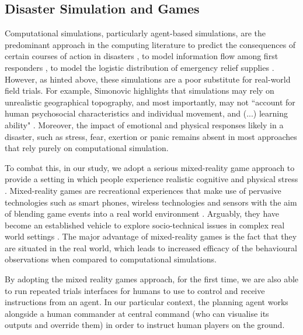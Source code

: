 \subsection{Disaster Simulation and Games}
Computational simulations, particularly agent-based simulations, are the predominant approach in the computing literature to predict the consequences of certain courses of action in disasters \cite{Hawe2012}, to model information flow among first responders \cite{Robinson},  to model the logistic distribution of emergency relief supplies \cite{Lee2009}. However, as hinted above, these simulations are a poor substitute for real-world field trials. For example, Simonovic highlights that simulations may rely on unrealistic geographical topography, and most importantly, may not ``account for human psychosocial characteristics and individual movement, and (...) learning ability" \cite{Simonovic2010}.  Moreover, the impact of emotional and physical responses likely in a disaster, such as stress, fear, exertion or panic \cite{Drury2009} remains absent in most approaches that rely purely on computational simulation.

To combat this, in our study, we adopt a serious mixed-reality game approach to provide a setting in which people experience realistic cognitive and physical stress \cite{Fischer}. Mixed-reality games are recreational experiences that make use of pervasive technologies such as smart phones, wireless technologies and sensors with the aim of blending game events into a real world environment  \cite{Benford2005a} . Arguably, they have become an established vehicle to explore socio-technical issues in complex real world settings \cite{Crabtree2006a}. The major advantage of mixed-reality games is the fact that they are situated in the real world, which  leads to increased efficacy of the behavioural observations when compared to computational simulations. 

By adopting the mixed reality games approach, for the first time, we are also able to run repeated trials interfaces for humans to use to control and receive instructions from an agent. In our particular context, the planning agent works alongside a human commander at central command (who can visualise its outputs and override them) in order to instruct human players on the ground.

